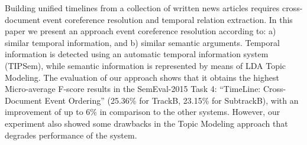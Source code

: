 Building unified timelines from a collection of written news articles requires cross-document event coreference resolution and temporal relation extraction. In this paper we present an approach event coreference resolution according to: a) similar temporal information, and b) similar semantic arguments. Temporal information is detected using an automatic temporal information system (TIPSem), while semantic information is represented by means of LDA Topic Modeling. The evaluation of our approach shows that it obtains the highest Micro-average F-score results in the SemEval-2015 Task 4: ``TimeLine: Cross-Document Event Ordering'' (25.36\% for TrackB, 23.15\% for SubtrackB), with an improvement of up to 6\% in comparison to the other systems. However, our experiment also showed some drawbacks in the Topic Modeling approach that degrades performance of the system.
